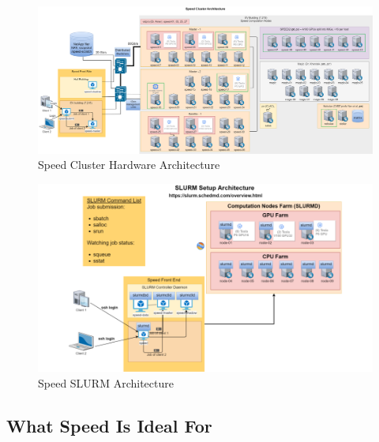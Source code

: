 \begin{figure}[htpb]
	\centering
	\includegraphics[width=\columnwidth]{images/speed-architecture-full}
	\caption{Speed Cluster Hardware Architecture}
	\label{fig:speed-architecture-full}
\end{figure}

\begin{figure}[htpb]
	\centering
	\includegraphics[width=\columnwidth]{images/slurm-arch}
	\caption{Speed SLURM Architecture}
	\label{fig:slurm-arch}
\end{figure}

\subsection{What Speed Is Ideal For}
\label{sect:speed-is-for}

